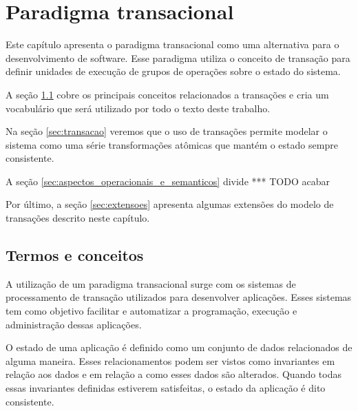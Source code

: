\documentclass[11pt,twoside,a4paper]{book}
\begin{document}

\chapter{Paradigma transacional}
\label{chap:transacao}
Este capítulo apresenta o paradigma transacional como uma alternativa para o desenvolvimento de software. Esse paradigma utiliza o conceito de transação para definir unidades de execução de grupos de operações sobre o estado do sistema.

A seção \ref{sec:termos_e_conceitos} cobre os principais conceitos relacionados a transações e cria um vocabulário que será utilizado por todo o texto deste trabalho.

Na seção \ref{sec:transacao} veremos que o uso de transações permite modelar o sistema como uma série transformações atômicas que mantém o estado sempre consistente.

A seção \ref{sec:aspectos_operacionais_e_semanticos} divide *** TODO acabar

Por último, a seção \ref{sec:extensoes} apresenta algumas extensões do modelo de transações descrito neste capítulo.

\section{Termos e conceitos}
\label{sec:termos_e_conceitos}
A utilização de um paradigma transacional surge com os sistemas de processamento de transação utilizados para desenvolver aplicações. Esses sistemas tem como objetivo facilitar e automatizar a programação, execução e administração dessas aplicações.

O estado de uma aplicação é definido como um conjunto de dados relacionados de alguma maneira. Esses relacionamentos podem ser vistos como invariantes em relação aos dados e em relação a como esses dados são alterados. Quando todas essas invariantes definidas estiverem satisfeitas, o estado da aplicação é dito consistente.


\end{document}
